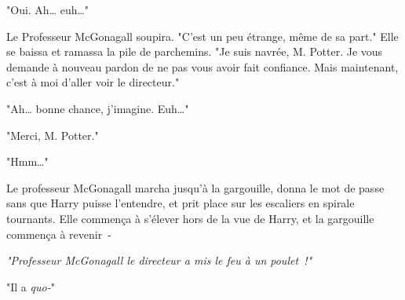 "Oui. Ah… euh…"

Le Professeur McGonagall soupira. "C'est un peu étrange, même de sa part." Elle se baissa et ramassa la pile de parchemins. "Je suis navrée, M. Potter. Je vous demande à nouveau pardon de ne pas vous avoir fait confiance. Mais maintenant, c'est à moi d'aller voir le directeur."

"Ah… bonne chance, j'imagine. Euh…"

"Merci, M. Potter."

"Hmm…"

Le professeur McGonagall marcha jusqu'à la gargouille, donna le mot de passe sans que Harry puisse l'entendre, et prit place sur les escaliers en spirale tournants. Elle commença à s'élever hors de la vue de Harry, et la gargouille commença à revenir~-

\emph{"Professeur McGonagall le directeur a mis le feu à un poulet~!"}

"Il a \emph{quo-}" 

